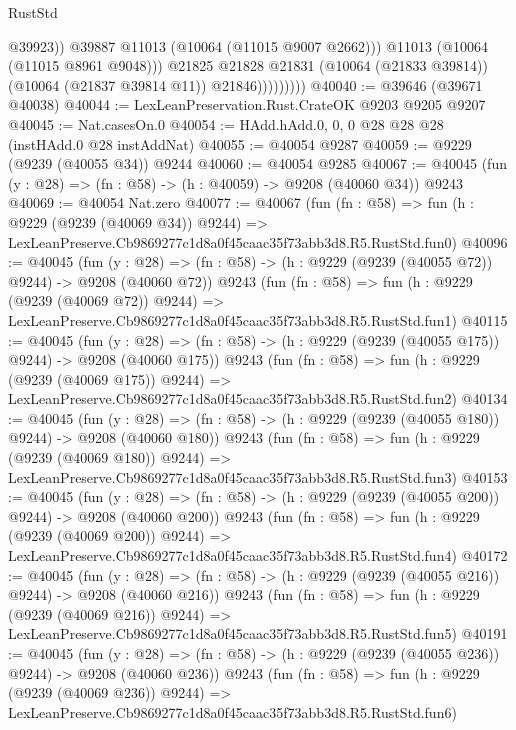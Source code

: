 \begin{lexlean}{RustStd}
\begin{coremodule}
                              @39923))
                          @39887
                          @11013
                          (@10064 (@11015 @9007 @2662)))
                        @11013
                        (@10064 (@11015 @8961 @9048)))
                      @21825
                      @21828
                      @21831
                      (@10064 (@21833 @39814))
                      (@10064 (@21837 @39814 @11))
                      @21846)))))))))
@40040 := @39646 (@39671 @40038)
@40044 := LexLeanPreservation.Rust.CrateOK @9203 @9205 @9207
@40045 := Nat.casesOn.{0}
@40054 := HAdd.hAdd.{0, 0, 0} @28 @28 @28 (instHAdd.{0} @28 instAddNat)
@40055 := @40054 @9287
@40059 := @9229 (@9239 (@40055 @34)) @9244
@40060 := @40054 @9285
@40067 := @40045 (fun (y : @28) => (fn : @58) -> (h : @40059) -> @9208 (@40060 @34)) @9243
@40069 := @40054 Nat.zero
@40077 := @40067
    (fun (fn : @58) =>
    fun (h : @9229 (@9239 (@40069 @34)) @9244) =>
    LexLeanPreserve.Cb9869277c1d8a0f45caac35f73abb3d8.R5.RustStd.fun0)
@40096 := @40045
    (fun (y : @28) => (fn : @58) -> (h : @9229 (@9239 (@40055 @72)) @9244) -> @9208 (@40060 @72))
    @9243
    (fun (fn : @58) =>
    fun (h : @9229 (@9239 (@40069 @72)) @9244) =>
    LexLeanPreserve.Cb9869277c1d8a0f45caac35f73abb3d8.R5.RustStd.fun1)
@40115 := @40045
    (fun (y : @28) => (fn : @58) -> (h : @9229 (@9239 (@40055 @175)) @9244) -> @9208 (@40060 @175))
    @9243
    (fun (fn : @58) =>
    fun (h : @9229 (@9239 (@40069 @175)) @9244) =>
    LexLeanPreserve.Cb9869277c1d8a0f45caac35f73abb3d8.R5.RustStd.fun2)
@40134 := @40045
    (fun (y : @28) => (fn : @58) -> (h : @9229 (@9239 (@40055 @180)) @9244) -> @9208 (@40060 @180))
    @9243
    (fun (fn : @58) =>
    fun (h : @9229 (@9239 (@40069 @180)) @9244) =>
    LexLeanPreserve.Cb9869277c1d8a0f45caac35f73abb3d8.R5.RustStd.fun3)
@40153 := @40045
    (fun (y : @28) => (fn : @58) -> (h : @9229 (@9239 (@40055 @200)) @9244) -> @9208 (@40060 @200))
    @9243
    (fun (fn : @58) =>
    fun (h : @9229 (@9239 (@40069 @200)) @9244) =>
    LexLeanPreserve.Cb9869277c1d8a0f45caac35f73abb3d8.R5.RustStd.fun4)
@40172 := @40045
    (fun (y : @28) => (fn : @58) -> (h : @9229 (@9239 (@40055 @216)) @9244) -> @9208 (@40060 @216))
    @9243
    (fun (fn : @58) =>
    fun (h : @9229 (@9239 (@40069 @216)) @9244) =>
    LexLeanPreserve.Cb9869277c1d8a0f45caac35f73abb3d8.R5.RustStd.fun5)
@40191 := @40045
    (fun (y : @28) => (fn : @58) -> (h : @9229 (@9239 (@40055 @236)) @9244) -> @9208 (@40060 @236))
    @9243
    (fun (fn : @58) =>
    fun (h : @9229 (@9239 (@40069 @236)) @9244) =>
    LexLeanPreserve.Cb9869277c1d8a0f45caac35f73abb3d8.R5.RustStd.fun6)

\end{coremodule}
\end{lexlean}
